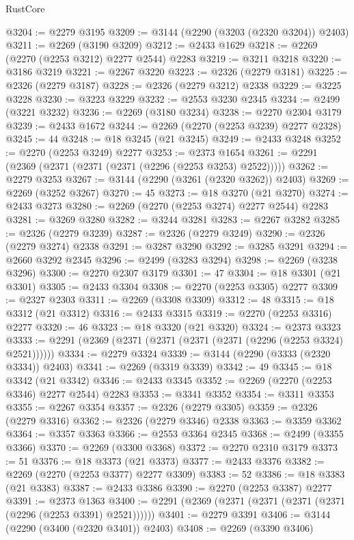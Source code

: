\begin{lexlean}{RustCore}
\begin{coremodule}
@3204 := @2279 @3195
@3209 := @3144 (@2290 (@3203 (@2320 @3204)) @2403)
@3211 := @2269 (@3190 @3209)
@3212 := @2433 @1629
@3218 := @2269 (@2270 (@2253 @3212) @2277 @2544) @2283
@3219 := @3211 @3218
@3220 := @3186 @3219
@3221 := @2267 @3220
@3223 := @2326 (@2279 @3181)
@3225 := @2326 (@2279 @3187)
@3228 := @2326 (@2279 @3212) @2338
@3229 := @3225 @3228
@3230 := @3223 @3229
@3232 := @2553 @3230 @2345
@3234 := @2499 (@3221 @3232)
@3236 := @2269 (@3180 @3234)
@3238 := @2270 @2304 @3179
@3239 := @2433 @1672
@3244 := @2269 (@2270 (@2253 @3239) @2277 @2328)
@3245 := 44
@3248 := @18 @3245 (@21 @3245)
@3249 := @2433 @3248
@3252 := @2270 (@2253 @3249) @2277
@3253 := @2373 @1654
@3261 := @2291 (@2369 (@2371 (@2371 (@2371 (@2296 (@2253 @3253) @2522)))))
@3262 := @2279 @3253
@3267 := @3144 (@2290 (@3261 (@2320 @3262)) @2403)
@3269 := @2269 (@3252 @3267)
@3270 := 45
@3273 := @18 @3270 (@21 @3270)
@3274 := @2433 @3273
@3280 := @2269 (@2270 (@2253 @3274) @2277 @2544) @2283
@3281 := @3269 @3280
@3282 := @3244 @3281
@3283 := @2267 @3282
@3285 := @2326 (@2279 @3239)
@3287 := @2326 (@2279 @3249)
@3290 := @2326 (@2279 @3274) @2338
@3291 := @3287 @3290
@3292 := @3285 @3291
@3294 := @2660 @3292 @2345
@3296 := @2499 (@3283 @3294)
@3298 := @2269 (@3238 @3296)
@3300 := @2270 @2307 @3179
@3301 := 47
@3304 := @18 @3301 (@21 @3301)
@3305 := @2433 @3304
@3308 := @2270 (@2253 @3305) @2277
@3309 := @2327 @2303
@3311 := @2269 (@3308 @3309)
@3312 := 48
@3315 := @18 @3312 (@21 @3312)
@3316 := @2433 @3315
@3319 := @2270 (@2253 @3316) @2277
@3320 := 46
@3323 := @18 @3320 (@21 @3320)
@3324 := @2373 @3323
@3333 := @2291 (@2369 (@2371 (@2371 (@2371 (@2371 (@2296 (@2253 @3324) @2521))))))
@3334 := @2279 @3324
@3339 := @3144 (@2290 (@3333 (@2320 @3334)) @2403)
@3341 := @2269 (@3319 @3339)
@3342 := 49
@3345 := @18 @3342 (@21 @3342)
@3346 := @2433 @3345
@3352 := @2269 (@2270 (@2253 @3346) @2277 @2544) @2283
@3353 := @3341 @3352
@3354 := @3311 @3353
@3355 := @2267 @3354
@3357 := @2326 (@2279 @3305)
@3359 := @2326 (@2279 @3316)
@3362 := @2326 (@2279 @3346) @2338
@3363 := @3359 @3362
@3364 := @3357 @3363
@3366 := @2553 @3364 @2345
@3368 := @2499 (@3355 @3366)
@3370 := @2269 (@3300 @3368)
@3372 := @2270 @2310 @3179
@3373 := 51
@3376 := @18 @3373 (@21 @3373)
@3377 := @2433 @3376
@3382 := @2269 (@2270 (@2253 @3377) @2277 @3309)
@3383 := 52
@3386 := @18 @3383 (@21 @3383)
@3387 := @2433 @3386
@3390 := @2270 (@2253 @3387) @2277
@3391 := @2373 @1363
@3400 := @2291 (@2369 (@2371 (@2371 (@2371 (@2371 (@2296 (@2253 @3391) @2521))))))
@3401 := @2279 @3391
@3406 := @3144 (@2290 (@3400 (@2320 @3401)) @2403)
@3408 := @2269 (@3390 @3406)

\end{coremodule}
\end{lexlean}
